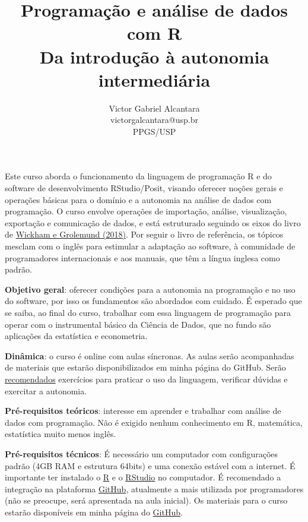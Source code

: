 \documentclass[a4paper,12pt]{article}
\title{\vspace{-3.5cm}Programação e análise de dados com R \\ \large Da introdução à autonomia intermediária}
\author{Victor Gabriel Alcantara \\ victorgalcantara@usp.br \\ PPGS/USP}
\date{}
\begin{document}
\maketitle

Este curso aborda o funcionamento da linguagem de programação R e do software de desenvolvimento RStudio/Posit, visando oferecer noções gerais e operações básicas para o domínio e a autonomia na análise de dados com programação. O curso envolve operações de importação, análise, visualização, exportação e comunicação de dados, e está estruturado seguindo os eixos do livro de \href{https://r4ds.had.co.nz/}{Wickham e Grolemund (2018)}. Por seguir o livro de referência, os tópicos mesclam com o inglês para estimular a adaptação ao software, à comunidade de programadores internacionais e aos manuais, que têm a língua inglesa como padrão.

\vspace{1cm}

\textbf{Objetivo geral}: oferecer condições para a autonomia na programação e no uso do software, por isso os fundamentos são abordados com cuidado. É esperado que se saiba, ao final do curso, trabalhar com essa linguagem de programação para operar com o instrumental básico da Ciência de Dados, que no fundo são aplicações da estatística e econometria.

\vspace{0.5cm}

\textbf{Dinâmica}: o curso é online com aulas síncronas. As aulas serão acompanhadas de materiais que estarão disponibilizados em minha página do GitHub. Serão \underline{recomendados} exercícios para praticar o uso da linguagem, verificar dúvidas e exercitar a autonomia.

\vspace{0.5cm}

\textbf{Pré-requisitos teóricos}: interesse em aprender e trabalhar com análise de dados com programação. Não é exigido nenhum conhecimento em R, matemática, estatística muito menos inglês.

\vspace{0.5cm}

\textbf{Pré-requisitos técnicos}: É necessário um computador com configurações padrão (4GB RAM e estrutura 64bits) e uma conexão estável com a internet. É importante ter instalado o \href{https://brieger.esalq.usp.br/CRAN/}{R} e o \href{https://www.rstudio.com/products/rstudio/download}{RStudio} no computador. É recomendado a integração na plataforma \href{https://github.com/}{GitHub}, atualmente a mais utilizada por programadores (não se preocupe, será apresentada na aula inicial). Os materiais para o curso estarão disponíveis em minha página do \href{https://github.com/victorgalcantara?tab=repositories}{GitHub}.
\end{document}

